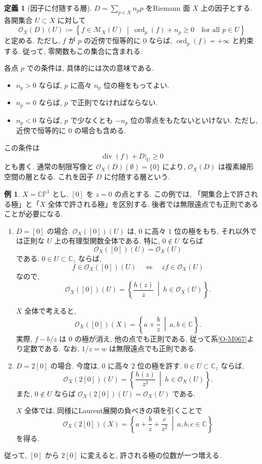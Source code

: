 \documentclass[dvipdfmx,a4paper,11pt]{article} %
\newcommand{\C}{\mathbb{C}}
\theoremstyle{definition}
\numberwithin{equation}{section}
\newtheorem{dfn}[thm]{定義}
\newtheorem{exa}[thm]{例}
\begin{document}
\begin{dfn}[因子に付随する層]\label{O-M199}
$D=\sum_{p\in X}n_p p$ をRiemann 面 $X$ 上の因子とする.
各開集合 $U\subset X$ に対して
\[
\mathcal O_X(D)(U)
:=
\left\{
f\in\mathcal M_X(U)
\ \middle|\
\operatorname{ord}_p(f)+n_p\geq0
\quad\text{for all }p\in U
\right\}
\]
と定める.
ただし, $f$ が $p$ の近傍で恒等的に $0$ ならば, 
$\operatorname{ord}_p(f)=+\infty$ と約束する.
従って, 零関数もこの集合に含まれる.

各点 $p$ での条件は, 具体的には次の意味である.
\begin{itemize}
\item $n_p>0$ ならば, $p$ に高々 $n_p$ 位の極をもってよい.
\item $n_p=0$ ならば, $p$ で正則でなければならない.
\item $n_p<0$ ならば, $p$ で少なくとも $-n_p$ 位の零点をもたないといけない.
ただし, 近傍で恒等的に $0$ の場合も含める.
\end{itemize}
この条件は
\[
\operatorname{div}(f)+D|_U\geq0
\]
とも書く.
通常の制限写像と $\mathcal O_X(D)(\emptyset)=\{0\}$ により, 
$\mathcal O_X(D)$ は複素線形空間の層となる.
これを因子 $D$ に付随する層という.
\end{dfn}

\begin{exa}
\label{O-M200}
$X=\C\mathbb P^1$ とし, $[0]$ を $z=0$ の点とする.
この例では, 「開集合上で許される極」と「$X$ 全体で許される極」を区別する. 後者では無限遠点でも正則であることが必要になる.

\begin{enumerate}
\item

$D=[0]$ の場合.
$\mathcal O_X([0])(U)$ は, 
$0$ に高々 $1$ 位の極をもち, それ以外では正則な
$U$ 上の有理型関数全体である.
特に, $0\notin U$ ならば
\[
\mathcal O_X([0])(U)=\mathcal O_X(U)
\]
である.
$0\in U\subset\C_z$ ならば, 
\[
f\in\mathcal O_X([0])(U)
\quad\Longleftrightarrow\quad
zf\in\mathcal O_X(U)
\]
なので, 
\[
\mathcal O_X([0])(U)
=\left\{\frac{h(z)}z\ \middle|\ h\in\mathcal O_X(U)\right\}.
\]

$X$ 全体で考えると, 
\[
\mathcal O_X([0])(X)
=\left\{a+\frac bz\ \middle|\ a,b\in\C\right\}.
\]
実際, $f-b/z$ は $0$ の極が消え, 他の点でも正則である. 従って系\ref{O-M067}より定数である.
なお, $1/z=w$ は無限遠点でも正則である.

\item

$D=2[0]$ の場合.
今度は, $0$ に高々 $2$ 位の極を許す.
$0\in U\subset\C_z$ ならば, 
\[
\mathcal O_X(2[0])(U)
=\left\{\frac{h(z)}{z^2}\ \middle|\ h\in\mathcal O_X(U)\right\}.
\]
また, $0\notin U$ ならば
$\mathcal O_X(2[0])(U)=\mathcal O_X(U)$ である.

$X$ 全体では, 同様にLaurent展開の負べきの項を引くことで
\[
\mathcal O_X(2[0])(X)
=\left\{a+\frac bz+\frac c{z^2}\ \middle|\ a,b,c\in\C\right\}
\]
を得る.
\end{enumerate}
従って, $[0]$ から $2[0]$ に変えると, 
許される極の位数が一つ増える.
\end{exa}
\end{document}
